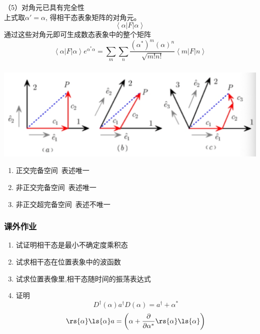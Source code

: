 \begin{frame} 
\frametitle{}
    （5）对角元已具有完全性 \\ {\vspace*{0.6em}}
      上式取$\alpha'=\alpha$, 得相干态表象矩阵的对角元。
      \[ \left\langle \alpha|F|\alpha \right\rangle\]
      通过这些对角元即可生成数态表象中的整个矩阵
      \[ \left\langle \alpha|F|\alpha \right\rangle e^{\alpha^* \alpha} = \sum_m \sum_n  \frac{(\alpha^*)^m (\alpha)^n}{\sqrt{m! n!}} \left\langle m|F|n \right\rangle\]
\end{frame}

\begin{frame} 
 \frametitle{}
        \begin{center}
             \includegraphics[width=1.0\textwidth]{figs/2022-05-11-11-10-06.png}
        \end{center}
    \begin{enumerate}
        \item 正交完备空间~表述唯一
        \item 非正交完备空间~表述唯一
        \item 非正交超完备空间~表述不唯一
    \end{enumerate}
\end{frame}

\begin{frame}
    \frametitle{课外作业}
    \begin{enumerate}
        \item 试证明相干态是最小不确定度乘积态
        \item 试求相干态在位置表象中的波函数
        \item 试求位置表像里,相干态随时间的振荡表达式
        \item 证明
        \[D^\dagger (\alpha) a^\dagger D (\alpha) = a^\dagger + \alpha^* \]
        \[ \rs{\alpha }\ls{\alpha } a= \left( \alpha + \frac{\partial }{\partial \alpha^*} \rs{\alpha }\ls{\alpha } \right)\]
    \end{enumerate}
\end{frame}
